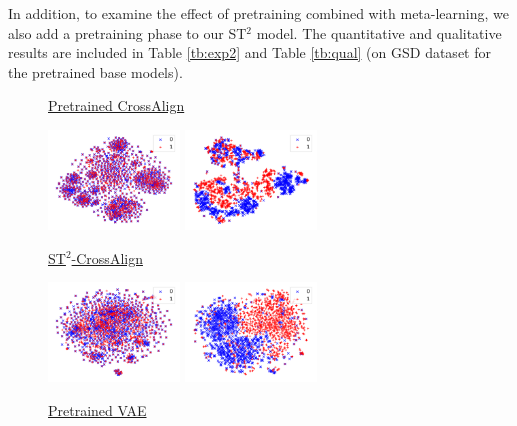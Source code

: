 In addition, to examine the effect of pretraining combined with meta-learning, we also add a pretraining phase to our ST$^2$ model. The quantitative and qualitative results are included in Table \ref{tb:exp2} and Table \ref{tb:qual} (on GSD dataset for the pretrained base models).
\begin{figure}[t!]
	\underline{\small Pretrained CrossAlign}\\
	\begin{minipage}{0.45\linewidth}
		\centering
		\includegraphics[width=3.5cm]{./images/ca_pre_c.pdf}
	\end{minipage}
	\begin{minipage}{0.45\linewidth}
		\centering
		\includegraphics[width=3.5cm]{./images/ca_pre_s.pdf}
	\end{minipage}
	\underline{\small ST$^2$-CrossAlign}\\
	\begin{minipage}{0.45\linewidth}
		\centering
		\includegraphics[width=3.5cm]{./images/ca_maml_c.pdf}
	\end{minipage}
	\begin{minipage}{0.45\linewidth}
		\centering
		\includegraphics[width=3.5cm]{./images/ca_maml_s.pdf}
	\end{minipage}
	\underline{\small Pretrained VAE}\\
	\begin{minipage}{0.45\linewidth}

\end{minipage}
\end{figure}
